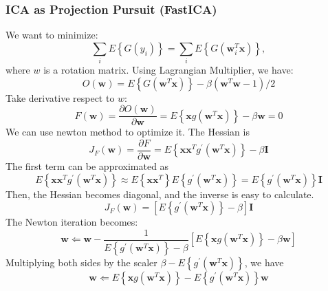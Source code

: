 \documentclass{article}
\begin{document}
\subsubsection{ICA as Projection Pursuit (FastICA)}
We want to minimize:
\begin{equation}
\sum_{i} E\left\{G\left(y_{i}\right)\right\}=\sum_{i} E\left\{G\left(\mathbf{w}_{i}^{T} \mathbf{x}\right)\right\},
\end{equation}
where $w$ is a rotation matrix. Using Lagrangian Multiplier, we have:
\begin{equation}
O(\mathbf{w})=E\left\{G\left(\mathbf{w}^{T} \mathbf{x}\right)\right\}-\beta\left(\mathbf{w}^{T} \mathbf{w}-1\right) / 2
\end{equation}
Take derivative respect to $w$:
\begin{equation}
F(\mathbf{w}) =\frac{\partial O(\mathbf{w})}{\partial \mathbf{w}}=E\left\{\mathbf{x} g\left(\mathbf{w}^{T} \mathbf{x}\right)\right\}-\beta \mathbf{w}=0
\end{equation}
We can use newton method to optimize it. The Hessian is 
\begin{equation}
J_{F}(\mathbf{w})=\frac{\partial F}{\partial \mathbf{w}}=E\left\{\mathbf{x} \mathbf{x}^{T} g^{\prime}\left(\mathbf{w}^{T} \mathbf{x}\right)\right\}-\beta \mathbf{I}
\end{equation}
The first term can be approximated as 
\begin{equation}
E\left\{\mathbf{x} \mathbf{x}^{T} g^{\prime}\left(\mathbf{w}^{T} \mathbf{x}\right)\right\} \approx E\left\{\mathbf{x} \mathbf{x}^{T}\right\} E\left\{g^{\prime}\left(\mathbf{w}^{T} \mathbf{x}\right)\right\}=E\left\{g^{\prime}\left(\mathbf{w}^{T} \mathbf{x}\right)\right\} \mathbf{I}
\end{equation}
Then, the Hessian becomes diagonal, and the inverse is easy to calculate.
\begin{equation}
J_{F}(\mathbf{w})=\left[E\left\{g^{\prime}\left(\mathbf{w}^{T} \mathbf{x}\right)\right\}-\beta\right] \mathbf{I}
\end{equation}
The Newton iteration becomes:
\begin{equation}
\mathbf{w} \Leftarrow \mathbf{w}-\frac{1}{E\left\{g^{\prime}\left(\mathbf{w}^{T} \mathbf{x}\right)\right\}-\beta}\left[E\left\{\mathbf{x} g\left(\mathbf{w}^{T} \mathbf{x}\right)\right\}-\beta \mathbf{w}\right]
\end{equation}
Multiplying both sides by the scaler $
\beta-E\left\{g^{\prime}\left(\mathbf{w}^{T} \mathbf{x}\right)\right\}
$, we have
\begin{equation}
\mathbf{w} \Leftarrow E\left\{\mathbf{x} g\left(\mathbf{w}^{T} \mathbf{x}\right)\right\}-E\left\{g^{\prime}\left(\mathbf{w}^{T} \mathbf{x}\right)\right\} \mathbf{w}
\end{equation}
\end{document}
